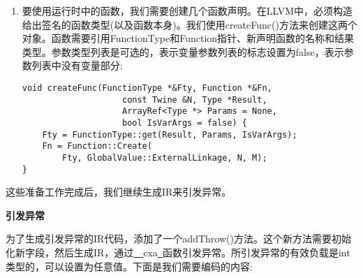 \begin{enumerate}
\item 要使用运行时中的函数，我们需要创建几个函数声明。在LLVM中，必须构造给出签名的函数类型(以及函数本身)。我们使用createFunc()方法来创建这两个对象。函数需要引用FunctionType和Function指针、新声明函数的名称和结果类型。参数类型列表是可选的，表示变量参数列表的标志设置为false，表示参数列表中没有变量部分:
\begin{lstlisting}[caption={}]
void createFunc(FunctionType *&Fty, Function *&Fn,
					const Twine &N, Type *Result,
					ArrayRef<Type *> Params = None,
					bool IsVarArgs = false) {
	Fty = FunctionType::get(Result, Params, IsVarArgs);
	Fn = Function::Create(
		Fty, GlobalValue::ExternalLinkage, N, M);
}
\end{lstlisting}
\end{enumerate}

这些准备工作完成后，我们继续生成IR来引发异常。\par

\hspace*{\fill} \par %
\textbf{引发异常}

为了生成引发异常的IR代码，添加了一个addThrow()方法。这个新方法需要初始化新字段，然后生成IR，通过\underline{~~}cxa\underline{~}函数引发异常。所引发异常的有效负载是int类型的，可以设置为任意值。下面是我们需要编码的内容:\par


